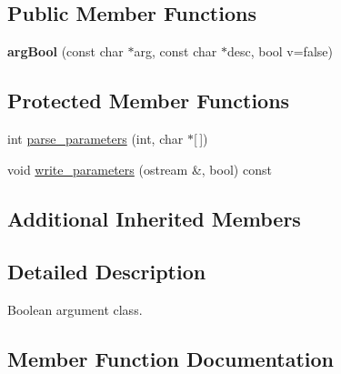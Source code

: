 \subsection*{Public Member Functions}
\begin{DoxyCompactItemize}
\item 
{\bfseries arg\+Bool} (const char $\ast$arg, const char $\ast$desc, bool v=false)\hypertarget{classclarg_1_1arg_bool_a9fcf0dd302882e22d36ee41547ad04ec}{}\label{classclarg_1_1arg_bool_a9fcf0dd302882e22d36ee41547ad04ec}

\end{DoxyCompactItemize}
\subsection*{Protected Member Functions}
\begin{DoxyCompactItemize}
\item 
int \hyperlink{classclarg_1_1arg_bool_a4e75d91370d7a99c8ec56eee6e112eef}{parse\+\_\+parameters} (int, char $\ast$\mbox{[}$\,$\mbox{]})
\item 
void \hyperlink{classclarg_1_1arg_bool_ae254f2a52551c3c811ad08c248d6b4a9}{write\+\_\+parameters} (ostream \&, bool) const 
\end{DoxyCompactItemize}
\subsection*{Additional Inherited Members}


\subsection{Detailed Description}
Boolean argument class. 

\subsection{Member Function Documentation}
